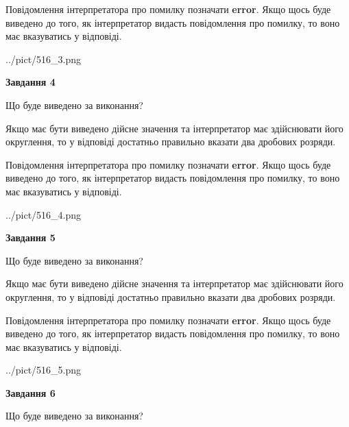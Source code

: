 \documentclass[12pt, ukrainian]{article}
\begin{document}
{\begin {Large}
Повідомлення інтерпретатора про помилку позначати \textbf{error}.
Якщо щось буде виведено до того, як інтерпретатор видасть повідомлення про помилку, 
то воно має вказуватись у відповіді. \par

\begin{center}
	{../pict/516_3.png}
\end{center}
\newpage

{\begin {center}\textbf{Завдання 4}\end {center}}\par
Що буде виведено за виконання? \par

Якщо має бути виведено дійсне значення та інтерпретатор має здійснювати його округлення, 
то у відповіді достатньо правильно вказати два дробових розряди.

Повідомлення інтерпретатора про помилку позначати \textbf{error}.
Якщо щось буде виведено до того, як інтерпретатор видасть повідомлення про помилку, 
то воно має вказуватись у відповіді. \par

\begin{center}
	{../pict/516_4.png}
\end{center}
\newpage

{\begin {center}\textbf{Завдання 5}\end {center}}\par
Що буде виведено за виконання? \par

Якщо має бути виведено дійсне значення та інтерпретатор має здійснювати його округлення, 
то у відповіді достатньо правильно вказати два дробових розряди.

Повідомлення інтерпретатора про помилку позначати \textbf{error}.
Якщо щось буде виведено до того, як інтерпретатор видасть повідомлення про помилку, 
то воно має вказуватись у відповіді. \par

\begin{center}
	{../pict/516_5.png}
\end{center}
\newpage

{\begin {center}\textbf{Завдання 6}\end {center}}\par
Що буде виведено за виконання? \par


\end{Large}}
\end{document}
